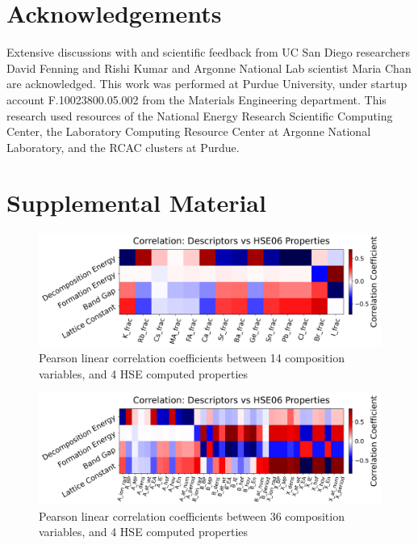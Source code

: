 \documentclass[twoside, twocolumn, 9pt, draft]{article}
\begin{document}
\section*{Acknowledgements}
\label{sec:orgaf19798}
Extensive discussions with and scientific feedback from UC San Diego
researchers David Fenning and Rishi Kumar and Argonne National Lab
scientist Maria Chan are acknowledged. This work was performed at
Purdue University, under startup account F.10023800.05.002 from the
Materials Engineering department. This research used resources of the
National Energy Research Scientific Computing Center, the Laboratory
Computing Resource Center at Argonne National Laboratory, and the RCAC
clusters at Purdue.



\section*{Supplemental Material}
\label{sec:orgac068e7}
\printglossaries

\begin{figure}
\centering
\includegraphics[width=.9\linewidth]{./expval/HSE_v_comp_pearson2.png}
\caption{\label{fig:pearson_hcomp} Pearson linear correlation coefficients between 14 composition variables, and 4 HSE computed properties}
\end{figure}

\begin{figure}
\centering
\includegraphics[width=.9\linewidth]{./expval/HSE_v_site_prop_pearson.png}
\caption{\label{fig:pearson_hsite} Pearson linear correlation coefficients between 36 composition variables, and 4 HSE computed properties}
\end{figure}
\end{document}
